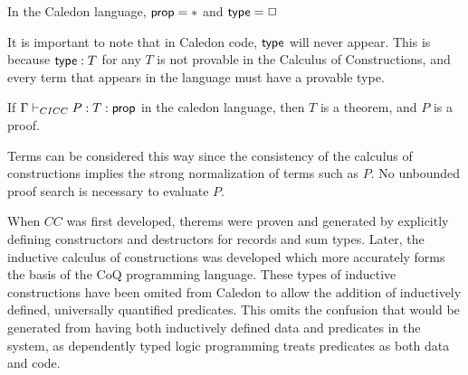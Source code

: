 \begin{definition}
In the Caledon language, $\mathsf{prop} = *$ and $\mathsf{type} = \Box$
\end{definition}

It is important to note that in Caledon code, $\mathsf{type}$ will never appear.  This is because $\mathsf{type} : T$ for any $T$
is not provable in the Calculus of Constructions, and every term that appears in the language must have a provable type.

\begin{definition}
If $\Gamma \vdash_{CICC} P : T : \mathsf{prop}$ in the caledon language, then $T$ is a theorem, and $P$ is a proof.
\end{definition}

Terms can be considered this way since the consistency of the calculus of constructions implies the strong normalization
of terms such as $P$.  No unbounded proof search is necessary to evaluate $P$.

When $CC$ was first developed, therems were proven and generated by explicitly defining
constructors and destructors for records and sum types.  Later, the inductive calculus of constructions was developed 
\citep{coquand1990inductively} which more accurately forms the basis of the CoQ programming language.  These types of inductive
constructions have been omited from Caledon to allow the addition of inductively defined, universally quantified predicates.
This omits the confusion that would be generated from having both inductively defined data and predicates in the system, as 
dependently typed logic programming treats predicates as both data and code.

